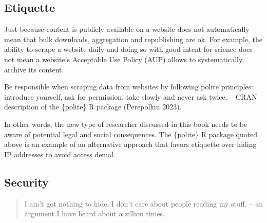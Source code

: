 \documentclass[
  12pt,
  letterpaper,
]{krantz}
\begin{document}
\hypertarget{etiquette}{%
\subsection{Etiquette}\label{etiquette}}

Just because content is publicly available on a website does not
automatically mean that bulk downloads, aggregation and republishing are
ok. For example, the ability to scrape a website daily and doing so with
good intent for science does not mean a website's Acceptable Use Policy
(AUP) allows to systematically archive its content.

\begin{tcolorbox}[enhanced jigsaw, colback=white, leftrule=.75mm, breakable, colframe=quarto-callout-important-color-frame, bottomrule=.15mm, arc=.35mm, opacityback=0, rightrule=.15mm, toprule=.15mm, left=2mm]
\begin{minipage}[t]{5.5mm}
\textcolor{quarto-callout-important-color}{\faExclamation}
\end{minipage}%
\begin{minipage}[t]{\textwidth - 5.5mm}

Be responsible when scraping data from websites by following polite
principles: introduce yourself, ask for permission, take slowly and
never ask twice. -- CRAN description of the \{polite\} R package
(Perepolkin 2023).

\end{minipage}%
\end{tcolorbox}

In other words, the new type of researcher discussed in this book needs
to be aware of potential legal and social consequences. The \{polite\} R
package quoted above is an example of an alternative approach that
favors etiquette over hiding IP addresses to avoid access denial.

\hypertarget{security}{%
\subsection{\texorpdfstring{Security}{Security}}\label{security}}

\begin{quote}
I ain't got nothing to hide. I don't care about people reading my stuff.
-- an argument I have heard about a zillion times.
\end{quote}
\end{document}
